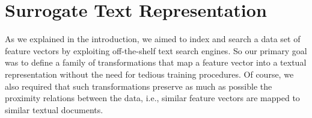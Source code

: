 

\section{Surrogate Text Representation}
\label{sec:str:surrogate}
As we explained in the introduction, we aimed to index and search a data set of feature vectors by exploiting off-the-shelf text search engines.
So our primary goal was to define a family of transformations that map a feature vector into a textual representation without the need for tedious training procedures.
Of course, we also required that such transformations preserve as much as possible the proximity relations between the data, i.e., similar feature vectors are mapped to similar textual documents.

